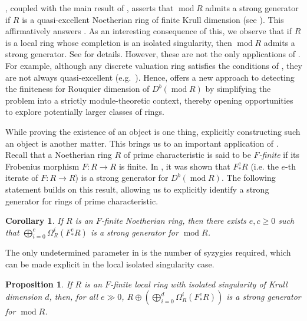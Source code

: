 \documentclass[11pt]{amsart}
\newcounter{intro}
\newtheorem{introcor}[intro]{Corollary}
\newtheorem{introprop}[intro]{Proposition}
\theoremstyle{plain}
\theoremstyle{definition}
\numberwithin{equation}{section}
\numberwithin{theorem}{section}
\begin{document}
, coupled with the main result of \cite{Aoki:2021}, asserts that $\operatorname{mod}R$ admits a strong generator if $R$ is a quasi-excellent Noetherian ring of finite Krull dimension (see ). This affirmatively answers \cite[Question 5.5]{Iyengar/Takahashi:2016}. As an interesting consequence of this, we observe that if $R$ is a local  ring whose completion is an isolated singularity, then $\operatorname{mod } R$ admits a strong generator. See  for details. 
However, these are not the only applications of . For example, although any discrete valuation ring satisfies the conditions of , they are not always quasi-excellent (e.g.\ \cite[Example 3.8]{Dey/Lank:2024}). Hence,  offers a new approach to detecting the finiteness for Rouquier dimension of $D^b (\operatorname{mod}R)$ by simplifying the problem into a strictly module-theoretic context, thereby opening opportunities to explore potentially larger classes of rings.

While proving the existence of an object is one thing, explicitly constructing such an object is another matter. This brings us to an important application of . Recall that a Noetherian ring $R$ of prime characteristic is said to be \textit{$F$-finite} if its Frobenius morphism $F\colon R \to R$ is finite. In \cite{BILMP:2023}, it was shown that $F_\ast^e R$ (i.e. the $e$-th iterate of $F\colon R \to R$) is a strong generator for $D^b(\operatorname{mod} R)$. The following statement builds on this result, allowing us to explicitly identify a strong generator for rings of prime characteristic.

\begin{introcor}\label{cor:f_finite_strong_gen_module_cat}
    If $R$ is an $F$-finite Noetherian ring, then there exists $e,c\geq 0$ such that $\bigoplus^c_{i=0} \Omega_R^i (F_\ast^e R)$ is a strong generator for $\operatorname{mod}R$.
\end{introcor}

The only undetermined parameter in  is the number of syzygies required, which can be made explicit in the local isolated singularity case.

\begin{introprop}\label{prop:f_finite_isolated singularity_module_category}
    If $R$ is an $F$-finite local ring with isolated singularity of Krull dimension $d$, then, for all $e\gg 0$, $R \oplus (\bigoplus_{i=0}^{d} \Omega_R^i (F^e_\ast R))$ is a strong generator for $\operatorname{mod} R$.    
\end{introprop} 
\end{document}
